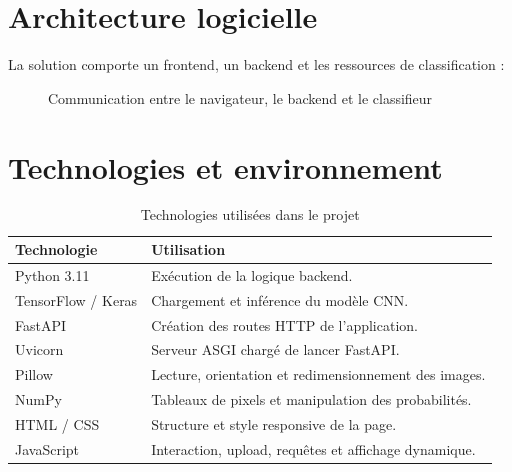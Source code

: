 \documentclass[11pt,a4paper,oneside]{report}
\begin{document}
\section{Architecture logicielle}
La solution comporte un frontend, un backend et les ressources de classification :
\begin{figure}[H]\centering
{}
\caption{Communication entre le navigateur, le backend et le classifieur}
\end{figure}
\section{Technologies et environnement}
\begin{table}[H]\centering
\caption{Technologies utilisées dans le projet}
\begin{tabularx}{\textwidth}{lX}
\toprule
\textbf{Technologie}&\textbf{Utilisation}\\
\midrule
Python 3.11&Exécution de la logique backend.\\
TensorFlow / Keras&Chargement et inférence du modèle CNN.\\
FastAPI&Création des routes HTTP de l'application.\\
Uvicorn&Serveur ASGI chargé de lancer FastAPI.\\
Pillow&Lecture, orientation et redimensionnement des images.\\
NumPy&Tableaux de pixels et manipulation des probabilités.\\
HTML / CSS&Structure et style responsive de la page.\\
JavaScript&Interaction, upload, requêtes et affichage dynamique.\\
\bottomrule
\end{tabularx}
\end{table}
\end{document}
